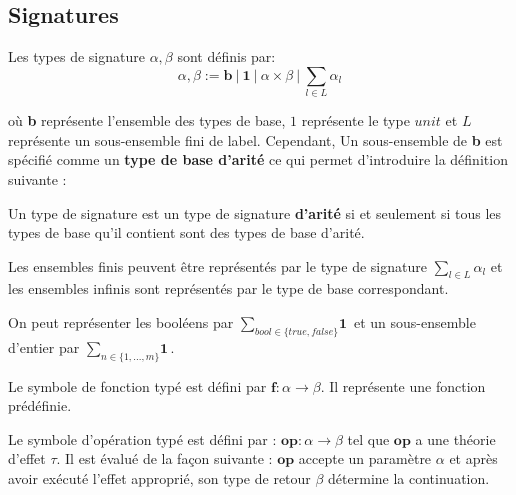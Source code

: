 \subsection{Signatures}

	Les types de signature $\alpha,\beta$ sont définis par:
	\[\alpha,\beta := \textbf{b}~|~\textbf{1}~|~\alpha \times \beta~|~\sum_{l \in L}\alpha_l\]
			
	où \textbf{b} représente l'ensemble des types de base, $1$ représente le type $unit$ et $L$ représente un sous-ensemble fini de label. 
	Cependant, Un sous-ensemble de \textbf{b} est spécifié comme un \textbf{type de base d'arité} ce qui permet d'introduire la définition suivante : 
	
	\begin{definition}
		Un type de signature est un type de signature \textbf{d'arité} si et seulement si tous les types de base qu'il contient sont des types de base d'arité.
	\end{definition}
	
	Les ensembles finis peuvent être représentés par le type de signature $\sum_{l \in L}\alpha_l$ et les ensembles infinis sont représentés par le type de base correspondant.
	
	\begin{exemple}
		On peut représenter les booléens par  $\sum_{bool \in \{true,false\}} \textbf{1}$ et un sous-ensemble d'entier par $\sum_{n \in \{1,...,m\}}\textbf{1}$.
	\end{exemple}
	\bigbreak

	Le symbole de fonction typé est défini par $\textbf{f} : \alpha \rightarrow \beta$. Il représente une fonction prédéfinie.

	
	\medbreak
	
	Le symbole d'opération typé est défini par : $\textbf{op} : \alpha \rightarrow \beta$ tel que $\textbf{op}$ a une théorie d'effet $\tau$.
	Il est évalué de la façon suivante :
	$\textbf{op}$ accepte un paramètre $\alpha$ et après avoir exécuté l'effet approprié, son type de retour $\beta$ détermine la continuation.

